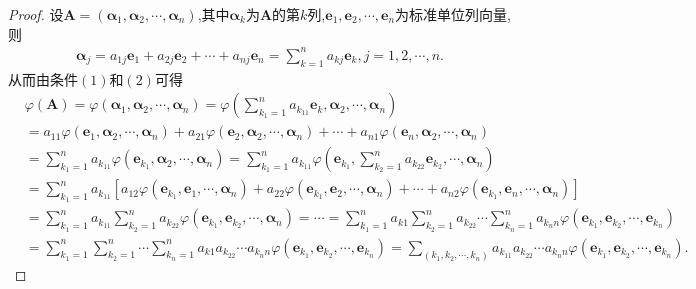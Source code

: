 \documentclass[../../main.tex]{subfiles}%
\begin{document}
\begin{proof}
设\(\boldsymbol{A} = (\boldsymbol{\alpha}_1,\boldsymbol{\alpha}_2,\cdots,\boldsymbol{\alpha}_n)\),其中\(\boldsymbol{\alpha}_k\)为\(\boldsymbol{A}\)的第\(k\)列,\(\boldsymbol{e}_1,\boldsymbol{e}_2,\cdots,\boldsymbol{e}_n\)为标准单位列向量,则
\begin{align*}
\boldsymbol{\alpha}_j = a_{1j}\boldsymbol{e}_1 + a_{2j}\boldsymbol{e}_2 + \cdots + a_{nj}\boldsymbol{e}_n = \sum_{k = 1}^{n}a_{kj}\boldsymbol{e}_k,j = 1,2,\cdots,n.
\end{align*}
从而由条件\((1)\)和\((2)\)可得
\begin{align*}
&\varphi\left( \boldsymbol{A} \right) =\varphi\left( \boldsymbol{\alpha }_1,\boldsymbol{\alpha }_2,\cdots ,\boldsymbol{\alpha }_n \right) =\varphi\left( \sum_{k_1=1}^n{a_{k_11}\boldsymbol{e}_k},\boldsymbol{\alpha }_2,\cdots ,\boldsymbol{\alpha }_n \right) 
\\
&=a_{11}\varphi\left( \boldsymbol{e}_1,\boldsymbol{\alpha }_2,\cdots ,\boldsymbol{\alpha }_n \right) +a_{21}\varphi\left( \boldsymbol{e}_2,\boldsymbol{\alpha }_2,\cdots ,\boldsymbol{\alpha }_n \right) +\cdots +a_{n1}\varphi\left( \boldsymbol{e}_n,\boldsymbol{\alpha }_2,\cdots ,\boldsymbol{\alpha }_n \right) 
\\
&=\sum_{k_1=1}^n{a_{k_11}\varphi\left( \boldsymbol{e}_{k_1},\boldsymbol{\alpha }_2,\cdots ,\boldsymbol{\alpha }_n \right)}=\sum_{k_1=1}^n{a_{k_11}\varphi\left( \boldsymbol{e}_{k_1},\sum_{k_2=1}^n{a_{k_22}\boldsymbol{e}_{k_2}},\cdots ,\boldsymbol{\alpha }_n \right)}
\\
&=\sum_{k_1=1}^n{a_{k_11}\left[ a_{12}\varphi\left( \boldsymbol{e}_{k_1},\boldsymbol{e}_1,\cdots ,\boldsymbol{\alpha }_n \right) +a_{22}\varphi\left( \boldsymbol{e}_{k_1},\boldsymbol{e}_2,\cdots ,\boldsymbol{\alpha }_n \right) +\cdots +a_{n2}\varphi\left( \boldsymbol{e}_{k_1},\boldsymbol{e}_n,\cdots ,\boldsymbol{\alpha }_n \right) \right]}
\\
&=\sum_{k_1=1}^n{a_{k_11}\sum_{k_2=1}^n{a_{k_22}}\varphi\left( \boldsymbol{e}_{k_1},\boldsymbol{e}_{k_2},\cdots ,\boldsymbol{\alpha }_n \right)}=\cdots =\sum_{k_1=1}^n{a_{k1}\sum_{k_2=1}^n{a_{k_22}}\cdots \sum_{k_n=1}^n{a_{k_nn}\varphi\left( \boldsymbol{e}_{k_1},\boldsymbol{e}_{k_2},\cdots ,\boldsymbol{e}_{k_n} \right)}}
\\
&=\sum_{k_1=1}^n{\sum_{k_2=1}^n{\cdots \sum_{k_n=1}^n{a_{k1}a_{k_22}\cdots a_{k_nn}\varphi\left( \boldsymbol{e}_{k_1},\boldsymbol{e}_{k_2},\cdots ,\boldsymbol{e}_{k_n} \right)}}}=\sum_{\left( k_1,k_2,\cdots ,k_n \right)}{a_{k_11}a_{k_22}\cdots a_{k_nn}\varphi\left( \boldsymbol{e}_{k_1},\boldsymbol{e}_{k_2},\cdots ,\boldsymbol{e}_{k_n} \right)}.

\end{align*}
\end{proof}
\end{document}
